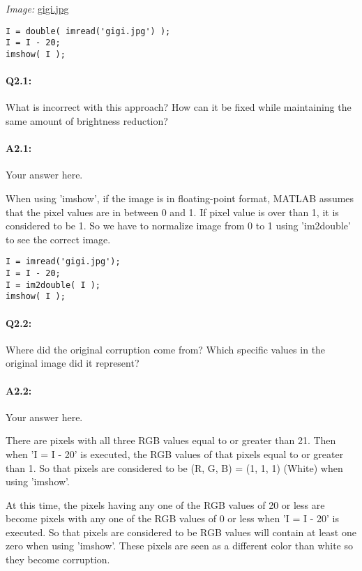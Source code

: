 \documentclass[11pt]{article}
\begin{document}
\emph{Image:} \href{gigi.jpg}{gigi.jpg}

\begin{lstlisting}[style=Matlab-editor]
I = double( imread('gigi.jpg') );
I = I - 20;
imshow( I );
\end{lstlisting}

\paragraph{Q2.1:} What is incorrect with this approach? How can it be fixed while maintaining the same amount of brightness reduction?

\paragraph{A2.1:} Your answer here.

When using 'imshow', if the image is in floating-point format, MATLAB assumes that the pixel values are in between 0 and 1. If pixel value is over than 1, it is considered to be 1. So we have to normalize image from 0 to 1 using 'im2double' to see the correct image.

\begin{lstlisting}[style=Matlab-editor]
I = imread('gigi.jpg');
I = I - 20;
I = im2double( I );
imshow( I );
\end{lstlisting}



\pagebreak
\paragraph{Q2.2:} Where did the original corruption come from? Which specific values in the original image did it represent?

\paragraph{A2.2:} Your answer here.

There are pixels with all three RGB values equal to or greater than 21. Then when 'I = I - 20' is executed, the RGB values of that pixels equal to or greater than 1. So that pixels are considered to be (R, G, B) = (1, 1, 1) (White) when using 'imshow'.

At this time, the pixels having any one of the RGB values of 20 or less are become pixels with any one of the RGB values of 0 or less when 'I = I - 20' is executed. So that pixels are considered to be RGB values will contain at least one zero when using 'imshow'. These pixels are seen as a different color than white so they become corruption. 

\end{document}
